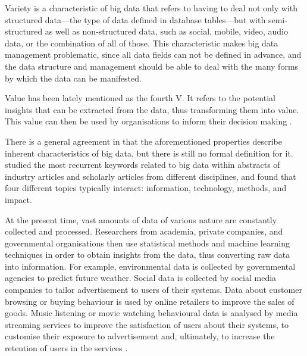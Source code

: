 Variety is a characteristic of big data that refers to having to deal not only with structured data---the type of data defined in database tables---but with semi-structured as well as non-structured data, such as social, mobile, video, audio data, or the combination of all of those. 
This characteristic makes big data management problematic, since all data fields can not be defined in advance, and the data structure and management should be able to deal with the many forms by which the data can be manifested.

Value has been lately mentioned as the fourth V.  It refers to the potential insights that can be extracted from the data, thus transforming them into value. This value can then be used by organisations to inform their decision making \autocite{manyika11big}. 

There is a general agreement in that the aforementioned properties describe inherent characteristics of big data, but there is still no formal definition for it. 
\textcite{demauro14big} studied the most recurrent keywords related to big data within abstracts of industry articles and scholarly articles from different disciplines, and found that  four different topics typically interact: information, technology, methods, and impact. 




At the present time, vast amounts of data of various nature are constantly collected and processed.
Researchers from academia, private companies, and governmental organisations then use statistical methods and machine learning techniques in order to obtain insights from the data, thus converting raw data into information. 
For example, environmental data is collected by governmental agencies to predict future weather. 
Social data is collected by social media companies to tailor advertisement to users of their systems. 
Data about customer browsing or buying behaviour is used by online retailers to improve the sales of goods. 
Music listening or movie watching behavioural data is analysed by media streaming services to improve the satisfaction of users about their systems, to customise their exposure to advertisement \autocite{echonest13how} and, ultimately, to increase the retention of users in the services \autocite{gomez15netflix}.




